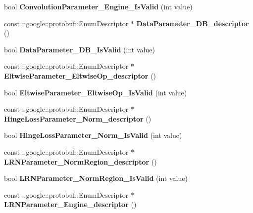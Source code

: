 \begin{DoxyCompactItemize}
bool {\bfseries Convolution\+Parameter\+\_\+\+Engine\+\_\+\+Is\+Valid} (int value)
\item 
\mbox{\label{namespacecaffe_a8362652e6f1f493db69f5dd357fc132b}} 
const \+::google\+::protobuf\+::\+Enum\+Descriptor $\ast$ {\bfseries Data\+Parameter\+\_\+\+D\+B\+\_\+descriptor} ()
\item 
\mbox{\label{namespacecaffe_a9e0d32e33443b8efd4a6fb2d3e96a3a7}} 
bool {\bfseries Data\+Parameter\+\_\+\+D\+B\+\_\+\+Is\+Valid} (int value)
\item 
\mbox{\label{namespacecaffe_a4f8997ec18c4dd4e5c5bfa104cdb4ca2}} 
const \+::google\+::protobuf\+::\+Enum\+Descriptor $\ast$ {\bfseries Eltwise\+Parameter\+\_\+\+Eltwise\+Op\+\_\+descriptor} ()
\item 
\mbox{\label{namespacecaffe_a49a8371eb7fd5a7d312a68f288d8776e}} 
bool {\bfseries Eltwise\+Parameter\+\_\+\+Eltwise\+Op\+\_\+\+Is\+Valid} (int value)
\item 
\mbox{\label{namespacecaffe_af032851c4f861dc5eb12a45a912f9f8b}} 
const \+::google\+::protobuf\+::\+Enum\+Descriptor $\ast$ {\bfseries Hinge\+Loss\+Parameter\+\_\+\+Norm\+\_\+descriptor} ()
\item 
\mbox{\label{namespacecaffe_a3fed874a50eb33a72fbcfb05d32f94ca}} 
bool {\bfseries Hinge\+Loss\+Parameter\+\_\+\+Norm\+\_\+\+Is\+Valid} (int value)
\item 
\mbox{\label{namespacecaffe_abb3855631204520d46604a4af0faa5eb}} 
const \+::google\+::protobuf\+::\+Enum\+Descriptor $\ast$ {\bfseries L\+R\+N\+Parameter\+\_\+\+Norm\+Region\+\_\+descriptor} ()
\item 
\mbox{\label{namespacecaffe_a5da6a9236f5c2acfca724d3881c465e2}} 
bool {\bfseries L\+R\+N\+Parameter\+\_\+\+Norm\+Region\+\_\+\+Is\+Valid} (int value)
\item 
\mbox{\label{namespacecaffe_a4baf3ff05477afec118883609779cc5f}} 
const \+::google\+::protobuf\+::\+Enum\+Descriptor $\ast$ {\bfseries L\+R\+N\+Parameter\+\_\+\+Engine\+\_\+descriptor} ()
\item 

\end{DoxyCompactItemize}
